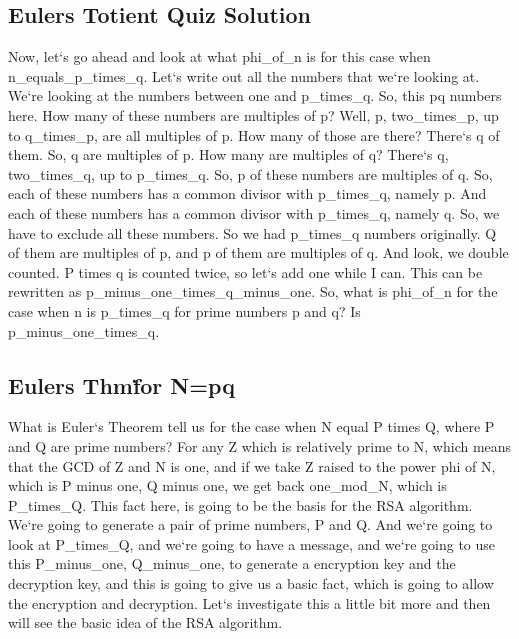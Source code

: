\subsection{Eulers Totient Quiz Solution}
Now, let`s go ahead and look at what phi\_of\_n is for this case when n\_equals\_p\_times\_q.
Let`s write out all the numbers that we`re looking at.
We`re looking at the numbers between one and p\_times\_q.
So, this pq numbers here.
How many of these numbers are multiples of p? Well, p, two\_times\_p, up to q\_times\_p, are all multiples of p.
How many of those are there? There`s q of them.
So, q are multiples of p.
How many are multiples of q? There`s q, two\_times\_q, up to p\_times\_q.
So, p of these numbers are multiples of q.
So, each of these numbers has a common divisor with p\_times\_q, namely p.
And each of these numbers has a common divisor with p\_times\_q, namely q.
So, we have to exclude all these numbers.
So we had p\_times\_q numbers originally.
Q of them are multiples of p, and p of them are multiples of q.
And look, we double counted.
P times q is counted twice, so let`s add one while I can.
This can be rewritten as p\_minus\_one\_times\_q\_minus\_one.
So, what is phi\_of\_n for the case when n is p\_times\_q for prime numbers p and q? Is p\_minus\_one\_times\_q.

\subsection{Eulers Thm\. for N=pq}
What is Euler`s Theorem tell us for the case when N equal P times Q, where P and Q are prime numbers? For any Z which is relatively prime to N, which means that the GCD of Z and N is one, and if we take Z raised to the power phi of N, which is P minus one, Q minus one, we get back one\_mod\_N, which is P\_times\_Q\@.
This fact here, is going to be the basis for the RSA algorithm.
We`re going to generate a pair of prime numbers, P and Q\@.
And we`re going to look at P\_times\_Q, and we`re going to have a message, and we`re going to use this P\_minus\_one, Q\_minus\_one, to generate a encryption key and the decryption key, and this is going to give us a basic fact, which is going to allow the encryption and decryption.
Let`s investigate this a little bit more and then will see the basic idea of the RSA algorithm.

